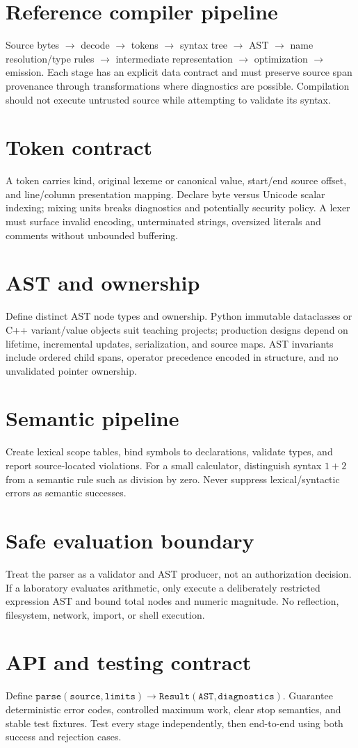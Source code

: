 \documentclass[11pt,letterpaper]{article}
\begin{document}
\makedoctitle\makedocsummary
\tableofcontents\clearpage

\section{Reference compiler pipeline}
Source bytes $\to$ decode $\to$ tokens $\to$ syntax tree $\to$ AST $\to$ name resolution/type rules $\to$ intermediate representation $\to$ optimization $\to$ emission. Each stage has an explicit data contract and must preserve source span provenance through transformations where diagnostics are possible. Compilation should not execute untrusted source while attempting to validate its syntax.
\section{Token contract}
A token carries kind, original lexeme or canonical value, start/end source offset, and line/column presentation mapping. Declare byte versus Unicode scalar indexing; mixing units breaks diagnostics and potentially security policy. A lexer must surface invalid encoding, unterminated strings, oversized literals and comments without unbounded buffering.
\section{AST and ownership}
Define distinct AST node types and ownership. Python immutable dataclasses or C++ variant/value objects suit teaching projects; production designs depend on lifetime, incremental updates, serialization, and source maps. AST invariants include ordered child spans, operator precedence encoded in structure, and no unvalidated pointer ownership.
\section{Semantic pipeline}
Create lexical scope tables, bind symbols to declarations, validate types, and report source-located violations. For a small calculator, distinguish syntax $1+2$ from a semantic rule such as division by zero. Never suppress lexical/syntactic errors as semantic successes.
\section{Safe evaluation boundary}
Treat the parser as a validator and AST producer, not an authorization decision. If a laboratory evaluates arithmetic, only execute a deliberately restricted expression AST and bound total nodes and numeric magnitude. No reflection, filesystem, network, import, or shell execution.
\section{API and testing contract}
Define $\mathtt{parse(source,limits)}\to\mathtt{Result(AST,diagnostics)}$. Guarantee deterministic error codes, controlled maximum work, clear stop semantics, and stable test fixtures. Test every stage independently, then end-to-end using both success and rejection cases.
\end{document}
